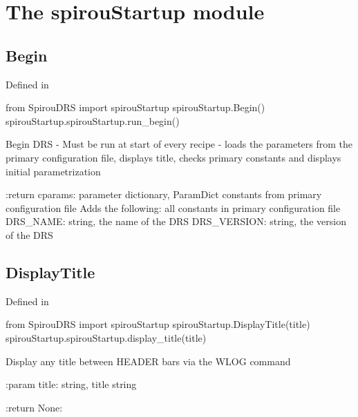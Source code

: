
\clearpage
\newpage
\noindent\begin{minipage}{\textwidth}
\section{The spirouStartup module}
\label{ch:the_module:spirouStartup}

\subsection{Begin}

Defined in \spirouStartup{}

\begin{pythonbox}
from SpirouDRS import spirouStartup
spirouStartup.Begin()
spirouStartup.spirouStartup.run_begin()
\end{pythonbox}

\begin{pythondocstring}
Begin DRS - Must be run at start of every recipe
- loads the parameters from the primary configuration file, displays
  title, checks primary constants and displays initial parametrization

:return cparams: parameter dictionary, ParamDict constants from primary
                 configuration file
        Adds the following:
            all constants in primary configuration file
            DRS_NAME: string, the name of the DRS
            DRS_VERSION: string, the version of the DRS
\end{pythondocstring}
\end{minipage}

\noindent\begin{minipage}{\textwidth}
\subsection{DisplayTitle}

Defined in \spirouStartup{}

\begin{pythonbox}
from SpirouDRS import spirouStartup
spirouStartup.DisplayTitle(title)
spirouStartup.spirouStartup.display_title(title)
\end{pythonbox}

\begin{pythondocstring}
Display any title between HEADER bars via the WLOG command

:param title: string, title string

:return None:
\end{pythondocstring}
\end{minipage}

